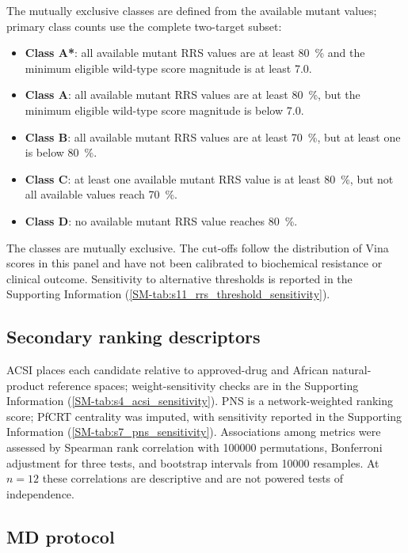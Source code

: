 \documentclass[journal=jcisd8,manuscript=article,layout=traditional]{achemso}
\begin{document}
The mutually exclusive classes are defined from the available mutant values; primary class counts use the complete two-target subset:
\begin{itemize}
    \item \textbf{Class A*}: all available mutant RRS values are at least \qty{80}{\percent} and the minimum eligible wild-type score magnitude is at least \qty{7.0}{\kcalmol}.
    \item \textbf{Class A}: all available mutant RRS values are at least \qty{80}{\percent}, but the minimum eligible wild-type score magnitude is below \qty{7.0}{\kcalmol}.
    \item \textbf{Class B}: all available mutant RRS values are at least \qty{70}{\percent}, but at least one is below \qty{80}{\percent}.
    \item \textbf{Class C}: at least one available mutant RRS value is at least \qty{80}{\percent}, but not all available values reach \qty{70}{\percent}.
    \item \textbf{Class D}: no available mutant RRS value reaches \qty{80}{\percent}.
\end{itemize}
The classes are mutually exclusive. The cut-offs follow the distribution of Vina scores in this panel and have not been calibrated to biochemical resistance or clinical outcome. Sensitivity to alternative thresholds is reported in the Supporting Information (\cref{SM-tab:s11_rrs_threshold_sensitivity}).

\subsection{Secondary ranking descriptors}

ACSI places each candidate relative to approved-drug and African natural-product reference spaces; weight-sensitivity checks are in the Supporting Information (\cref{SM-tab:s4_acsi_sensitivity}). PNS is a network-weighted ranking score; PfCRT centrality was imputed, with sensitivity reported in the Supporting Information (\cref{SM-tab:s7_pns_sensitivity}). Associations among metrics were assessed by Spearman rank correlation with \num{100000} permutations, Bonferroni adjustment for three tests, and bootstrap intervals from \num{10000} resamples. At $n=\num{12}$ these correlations are descriptive and are not powered tests of independence.

\subsection{MD protocol}
\end{document}
